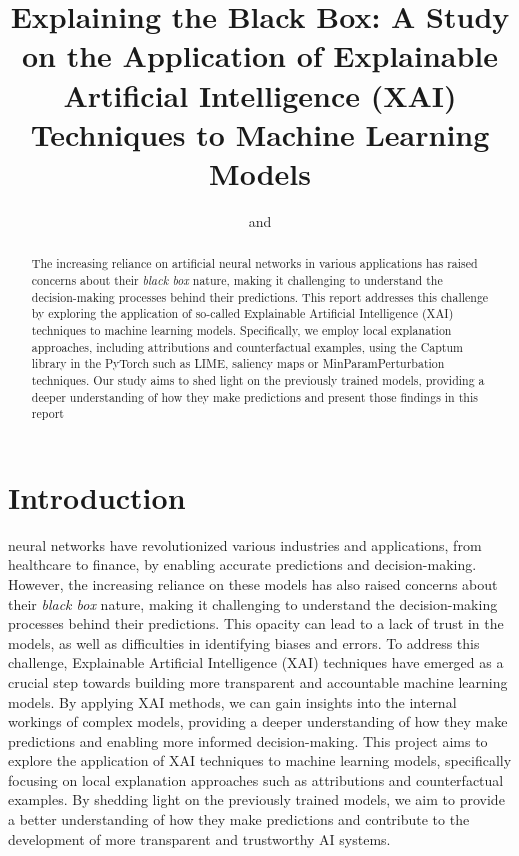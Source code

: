 \documentclass[journal, a4paper]{IEEEtran}
\begin{document}
\title{Explaining the Black Box: A Study on the Application of Explainable Artificial Intelligence (XAI) Techniques to Machine Learning Models}
\author{
    \large
    and
    \\[1ex]
    \normalsize
}


\maketitle

\begin{abstract}
    The increasing reliance on artificial neural networks in various applications has raised concerns about their \textit{black box} nature, making it challenging to understand the decision-making processes behind their predictions.
    This report addresses this challenge by exploring the application of so-called Explainable Artificial Intelligence (XAI) techniques to machine learning models.
    Specifically, we employ local explanation approaches, including attributions and counterfactual examples, using the Captum library in the PyTorch such as LIME, saliency maps or MinParamPerturbation techniques.
    Our study aims to shed light on the previously trained models, providing a deeper understanding of how they make predictions and present those findings in this report
\end{abstract}

\section{Introduction}\label{sec:introduction}

 neural networks have revolutionized various industries and applications, from healthcare to finance, by enabling accurate predictions and decision-making.
However, the increasing reliance on these models has also raised concerns about their \textit{black box} nature, making it challenging to understand the decision-making processes behind their predictions.
This opacity can lead to a lack of trust in the models, as well as difficulties in identifying biases and errors.
To address this challenge, Explainable Artificial Intelligence (XAI) techniques have emerged as a crucial step towards building more transparent and accountable machine learning models.
By applying XAI methods, we can gain insights into the internal workings of complex models, providing a deeper understanding of how they make predictions and enabling more informed decision-making.
This project aims to explore the application of XAI techniques to machine learning models, specifically focusing on local explanation approaches such as attributions and counterfactual examples.
By shedding light on the previously trained models, we aim to provide a better understanding of how they make predictions and contribute to the development of more transparent and trustworthy AI systems.
\end{document}
